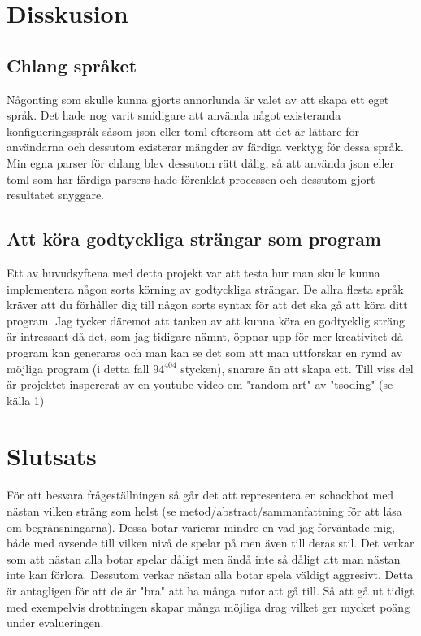 \documentclass{article}
\begin{document}
	\newpage
	\section{Disskusion}

    \subsection{Chlang språket}
    Någonting som skulle kunna gjorts annorlunda är valet av att skapa ett eget språk. Det hade nog varit smidigare att använda något existeranda konfigueringsspråk såsom json eller toml eftersom att det är lättare för användarna och dessutom existerar mängder av färdiga verktyg för dessa språk. Min egna parser för chlang blev dessutom rätt dålig, så att använda json eller toml som har färdiga parsers hade förenklat processen och dessutom gjort resultatet snyggare.

    \subsection{Att köra godtyckliga strängar som program}
    Ett av huvudsyftena med detta projekt var att testa hur man skulle kunna implementera någon sorts körning av godtyckliga strängar. De allra flesta språk kräver att du förhåller dig till någon sorts syntax för att det ska gå att köra ditt program. Jag tycker däremot att tanken av att kunna köra en godtycklig sträng är intressant då det, som jag tidigare nämnt, öppnar upp för mer kreativitet då program kan generaras och man kan se det som att man uttforskar en rymd av möjliga program (i detta fall ${94^404}$ stycken), snarare än att skapa ett. Till viss del är projektet inspererat av en youtube video om "random art" av "tsoding" (se källa 1)

	\newpage
	\section{Slutsats}
    För att besvara frågeställningen så går det att representera en schackbot med nästan vilken sträng som helst (se metod/abstract/sammanfattning för att läsa om begränsningarna). Dessa botar varierar mindre en vad jag förväntade mig, både med avsende till vilken nivå de spelar på men även till deras stil. Det verkar som att nästan alla botar spelar dåligt men ändå inte så dåligt att man nästan inte kan förlora. Dessutom verkar nästan alla botar spela väldigt aggresivt. Detta är antagligen för att de är "bra" att ha många rutor att gå till. Så att gå ut tidigt med exempelvis drottningen skapar många möjliga drag vilket ger mycket poäng under evalueringen. 
\end{document}
